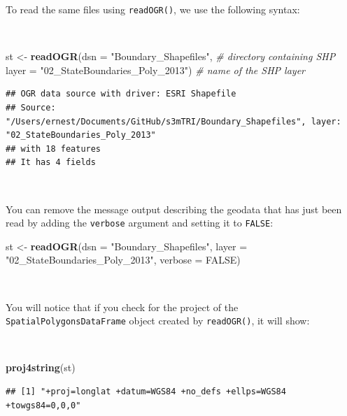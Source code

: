 \documentclass[11pt,a4paper]{article}
\newenvironment{Shaded}{}{}
\newcommand{\KeywordTok}[1]{\textcolor[rgb]{0.00,0.44,0.13}{\textbf{#1}}}
\newcommand{\DataTypeTok}[1]{\textcolor[rgb]{0.56,0.13,0.00}{#1}}
\newcommand{\StringTok}[1]{\textcolor[rgb]{0.25,0.44,0.63}{#1}}
\newcommand{\CommentTok}[1]{\textcolor[rgb]{0.38,0.63,0.69}{\textit{#1}}}
\newcommand{\OtherTok}[1]{\textcolor[rgb]{0.00,0.44,0.13}{#1}}
\newcommand{\NormalTok}[1]{#1}
\begin{document}
To read the same files using \texttt{readOGR()}, we use the following
syntax:

~

\begin{Shaded}
\begin{Highlighting}[]
\NormalTok{st <-}\StringTok{ }\KeywordTok{readOGR}\NormalTok{(}\DataTypeTok{dsn =} \StringTok{"Boundary_Shapefiles"}\NormalTok{,            }\CommentTok{# directory containing SHP}
              \DataTypeTok{layer =} \StringTok{"02_StateBoundaries_Poly_2013"}\NormalTok{) }\CommentTok{# name of the SHP layer}
\end{Highlighting}
\end{Shaded}

\begin{verbatim}
## OGR data source with driver: ESRI Shapefile 
## Source: "/Users/ernest/Documents/GitHub/s3mTRI/Boundary_Shapefiles", layer: "02_StateBoundaries_Poly_2013"
## with 18 features
## It has 4 fields
\end{verbatim}

~

You can remove the message output describing the geodata that has just
been read by adding the \texttt{verbose} argument and setting it to
\texttt{FALSE}:

\begin{Shaded}
\begin{Highlighting}[]
\NormalTok{st <-}\StringTok{ }\KeywordTok{readOGR}\NormalTok{(}\DataTypeTok{dsn =} \StringTok{"Boundary_Shapefiles"}\NormalTok{,}
              \DataTypeTok{layer =} \StringTok{"02_StateBoundaries_Poly_2013"}\NormalTok{,}
              \DataTypeTok{verbose =} \OtherTok{FALSE}\NormalTok{)}
\end{Highlighting}
\end{Shaded}

~

You will notice that if you check for the project of the
\texttt{SpatialPolygonsDataFrame} object created by \texttt{readOGR()},
it will show:

~

\begin{Shaded}
\begin{Highlighting}[]
\KeywordTok{proj4string}\NormalTok{(st)}
\end{Highlighting}
\end{Shaded}

\begin{verbatim}
## [1] "+proj=longlat +datum=WGS84 +no_defs +ellps=WGS84 +towgs84=0,0,0"
\end{verbatim}
\end{document}
